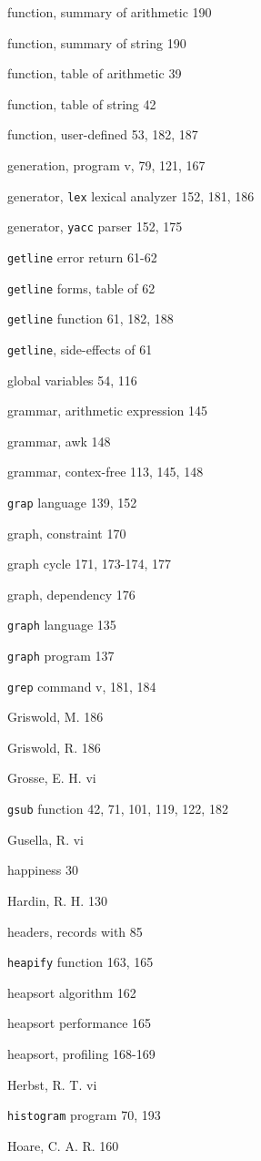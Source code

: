 \begin{multicols}{3}
function, summary of arithmetic 190

function, summary of string 190

function, table of arithmetic 39

function, table of string 42

function, user-defined 53, 182, 187

generation, program v, 79, 121, 167

generator, \verb'lex' lexical analyzer 152, 181, 186

generator, \verb'yacc' parser 152, 175

\verb'getline' error return 61-62

\verb'getline' forms, table of 62

\verb'getline' function 61, 182, 188

\verb'getline', side-effects of 61

global variables 54, 116

grammar, arithmetic expression 145

grammar, awk 148

grammar, contex-free 113, 145, 148

\verb'grap' language 139, 152

graph, constraint 170

graph cycle 171, 173-174, 177

graph, dependency 176

\verb'graph' language 135

\verb'graph' program 137

\verb'grep' command v, 181, 184

Griswold, M. 186

Griswold, R. 186

Grosse, E. H. vi

\verb'gsub' function 42, 71, 101, 119, 122, 182

Gusella, R. vi

happiness 30

Hardin, R. H. 130

headers, records with 85

\verb'heapify' function 163, 165

heapsort algorithm 162

heapsort performance 165

heapsort, profiling 168-169

Herbst, R. T. vi

\verb'histogram' program 70, 193

Hoare, C. A. R. 160


\end{multicols}

